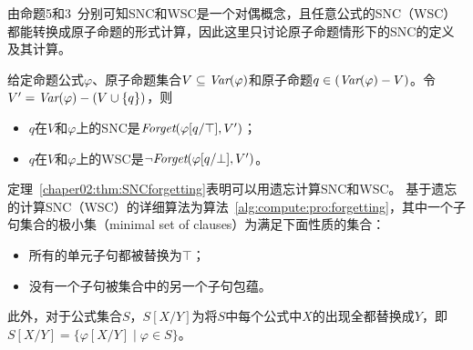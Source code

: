 由命题5和3~\cite{DBLP:journals/ai/Lin01}分别可知SNC和WSC是一个对偶概念，且任意公式的SNC（WSC）都能转换成原子命题的形式计算，因此这里只讨论原子命题情形下的SNC的定义及其计算。

\begin{theorem}\label{chaper02:thm:SNCforgetting}
	给定命题公式$\varphi$、原子命题集合$V\subseteq \textit{Var}(\varphi)$和原子命题$q\in (\textit{Var}(\varphi)-V)$。令$V'= \textit{Var}(\varphi) - (V\cup \{q\})$，则
	\begin{itemize}
		\item $q$在$V$和$\varphi$上的SNC是$\textit{Forget}(\varphi[q/\top], V')$；
		\item $q$在$V$和$\varphi$上的WSC是$\neg \textit{Forget}(\varphi[q/\bot], V')$。
	\end{itemize}
\end{theorem}


定理~\ref{chaper02:thm:SNCforgetting}表明可以用遗忘计算SNC和WSC。
基于遗忘的计算SNC（WSC）的详细算法为算法~\ref{alg:compute:pro:forgetting}，其中一个子句集合的极小集（minimal set of clauses）为满足下面性质的集合：
\begin{itemize}
	\item 所有的单元子句都被替换为$\top$；
	\item 没有一个子句被集合中的另一个子句包蕴。
\end{itemize}
此外，对于公式集合$S$，$S[X/Y]$为将$S$中每个公式中$X$的出现全都替换成$Y$，即$S[X/Y]=\{\varphi[X/Y]\mid \varphi\in S\}$。

